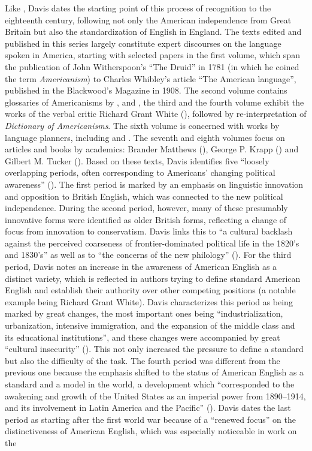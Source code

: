 Like \citet{Algeo2001b}, Davis dates the starting point of this process of recognition to the eighteenth century, following not only the American independence from Great Britain but also the standardization of English in England. The texts edited and published in this series largely constitute expert discourses on the language spoken in America, starting with selected papers in the first volume, which span the publication of John Witherspoon’s “The Druid” in 1781 (in which he coined the term \textit{Americanism}) to Charles Whibley’s article “The American language”, published in the Blackwood’s Magazine in 1908. The second volume contains glossaries of Americanisms by \citet{Elwyn1859}, \citet{Fallows1883} and \citet{Norton1890}, the third and the fourth volume exhibit the works of the verbal critic Richard Grant White (\citeyear{White1870,White1880}), followed by  re-interpretation of  \emph{Dictionary of Americanisms}. The sixth volume is concerned with works by language planners, including \citet{Molee1888} and \citet{Williams1890}. The seventh and eighth volumes focus on articles and books by academics: Brander Matthews (\citeyear{Brander1892b,Brander1901, Brander1909}), George P. Krapp (\citeyear{Krapp1919}) and Gilbert M. Tucker (\citeyear{Tucker1921}). Based on these texts, Davis identifies five “loosely overlapping periods, often corresponding to Americans’ changing political awareness” (\citeyear[xii]{Davis2003}). The first period is marked by an emphasis on linguistic innovation and opposition to British English, which was connected to the new political independence. During the second period, however, many of these presumably innovative forms were identified as older British forms, reflecting a change of focus from innovation to conservatism. Davis links this to “a cultural backlash against the perceived coarseness of frontier-dominated political life in the 1820’s and 1830’s” as well as to “the concerns of the new philology” (\citeyear[xii]{Davis2003}). For the third period, Davis notes an increase in the awareness of American English as a distinct variety, which is reflected in authors trying to define standard American English and establish their authority over other competing positions (a notable example being Richard Grant White). Davis characterizes this period as being marked by great changes, the most important ones being “industrialization, urbanization, intensive immigration, and the expansion of the middle class and its educational institutions”, and these changes were accompanied by great “cultural insecurity” (\citeyear[xii]{Davis2003}). This not only increased the pressure to define a standard but also the difficulty of the task. The fourth period was different from the previous one because the emphasis shifted to the status of American English as a standard and a model in the world, a development which “corresponded to the awakening and growth of the United States as an imperial power from 1890–1914, and its involvement in Latin America and the Pacific” (\citeyear[xiii]{Davis2003}). Davis dates the last period as starting after the first world war because of a “renewed focus” on the distinctiveness of American English, which was especially noticeable in  work on the 